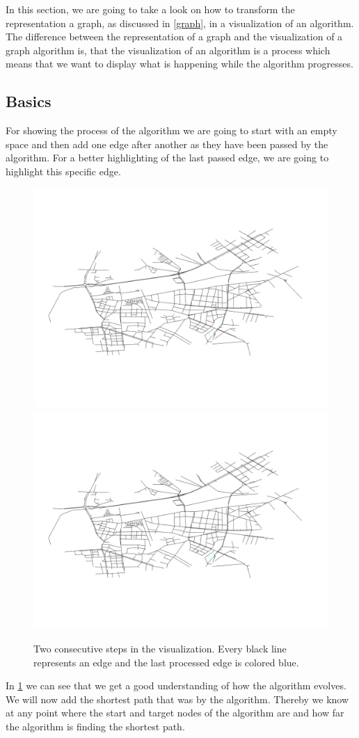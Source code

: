 \documentclass
[
	paper = a4,
    pagesize,
	12 pt,
	oneside,                       %
    open = right,
	DIV = calc,
	BCOR = 0 mm,                   %
	bibtotoc
]
{scrbook}
\begin{document}
In this section, we are going to take a look on how to transform the representation a graph, as discussed in \cref{graph}, in a visualization of an algorithm.
The difference between the representation of a graph and the visualization of a graph algorithm is, that the visualization of an algorithm is a process which means that we want to display what is happening while the algorithm progresses.

\subsection{Basics}
For showing the process of the algorithm we are going to start with an empty space and then add one edge after another as they have been passed by the algorithm.
For a better highlighting of the last passed edge, we are going to highlight this specific edge.

\begin{figure}[H]
    \includegraphics[width=.5\textwidth]{Images/vis-step-one.png}
    \includegraphics[width=.5\textwidth]{Images/vis-step-one.png}
\caption[]{Two consecutive steps in the visualization. Every black line represents an edge and the last processed edge is colored blue.}
\label{fig:two-steps}
\end{figure}

In \cref{fig:two-steps} we can see that we get a good understanding of how the algorithm evolves.
We will now add the shortest path that was by the algorithm.
Thereby we know at any point where the start and target nodes of the algorithm are and how far the algorithm is finding the shortest path.
\end{document}
